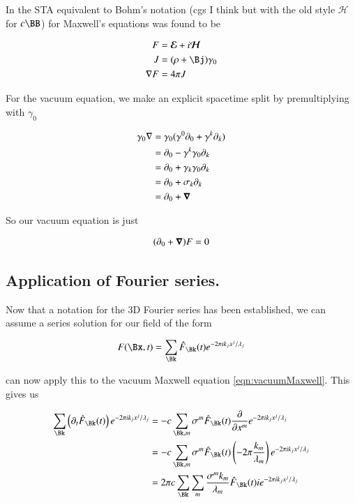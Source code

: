 \documentclass{article}
\newcommand{\EE}[0]{\boldsymbol{\mathcal{E}}}
\newcommand{\HH}[0]{\boldsymbol{\mathcal{H}}}
\begin{document}
In \cite{PJrayleighJeans} the STA equivalent to Bohm's notation (cgs I think but with the old style $\HH$ for $c\BB$) for Maxwell's equations was found to be

\begin{align}
F &= \EE + i\HH \\
J &= (\rho + \Bj) \gamma_0 \\
\grad F &= 4 \pi J
\end{align}

For the vacuum equation, we make an explicit spacetime split by premultiplying with $\gamma_0$

\begin{align*}
\gamma_0 \nabla 
&= \gamma_0 (\gamma^0 \partial_0 + \gamma^k \partial_k) \\
&= \partial_0 - \gamma^k \gamma_0 \partial_k \\
&= \partial_0 + \gamma_k \gamma_0 \partial_k \\
&= \partial_0 + \sigma_k \partial_k \\
&= \partial_0 + \boldsymbol{\nabla} \\
\end{align*}

So our vacuum equation is just

\begin{align}\label{eqn:vacuumMaxwell}
(\partial_0 + \boldsymbol{\nabla}) F = 0
\end{align}

\subsection{ Application of Fourier series. }

Now that a notation for the 3D Fourier series has been established, we
can assume a series solution for our field of the form

\begin{align}\label{eqn:assumed}
F(\Bx,t) = \sum_{\Bk} \hat{F}_{\Bk}(t) e^{-2\pi i k_j x^j/\lambda_j}
\end{align}

can now apply this to the vacuum Maxwell equation \ref{eqn:vacuumMaxwell}.
This gives us

\begin{align*}
\sum_{\Bk} \left(\partial_t \hat{F}_{\Bk}(t) \right) e^{-2\pi i k_j x^j/\lambda_j}
&= -c \sum_{\Bk, m} \sigma^m \hat{F}_{\Bk}(t) \PD{x^m}{} e^{-2\pi i k_j x^j/\lambda_j} \\
&= -c \sum_{\Bk, m} \sigma^m \hat{F}_{\Bk}(t) \left(-2 \pi \frac{k_m}{\lambda_m}\right) e^{-2\pi i k_j x^j/\lambda_j} \\
&= 2 \pi c \sum_{\Bk} \sum_m \frac{\sigma^m k_m}{\lambda_m} \hat{F}_{\Bk}(t) i e^{-2\pi i k_j x^j/\lambda_j} \\
\end{align*}
\end{document}
